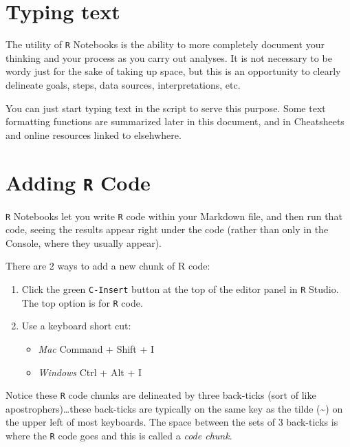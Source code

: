 \documentclass[
]{book}
\newcommand{\passthrough}[1]{#1}
\providecommand{\tightlist}{%
  \setlength{\itemsep}{0pt}\setlength{\parskip}{0pt}}
\begin{document}
\hypertarget{typing-text}{%
\section*{Typing text}\label{typing-text}}

The utility of \passthrough{\lstinline!R!} Notebooks is the ability to more completely document your thinking and your process as you carry out analyses. It is not necessary to be wordy just for the sake of taking up space, but this is an opportunity to clearly delineate goals, steps, data sources, interpretations, etc.

You can just start typing text in the script to serve this purpose. Some text formatting functions are summarized later in this document, and in Cheatsheets and online resources linked to elsehwhere.

\hypertarget{adding-r-code}{%
\section*{\texorpdfstring{Adding \texttt{R} Code}{Adding R Code}}\label{adding-r-code}}

\passthrough{\lstinline!R!} Notebooks let you write \passthrough{\lstinline!R!} code within your Markdown file, and then run that code, seeing the results appear right under the code (rather than only in the Console, where they usually appear).

There are 2 ways to add a new chunk of R code:

\begin{enumerate}
\def\labelenumi{\arabic{enumi}.}
\tightlist
\item
  Click the green \passthrough{\lstinline!C-Insert!} button at the top of the editor panel in \passthrough{\lstinline!R!} Studio. The top option is for \passthrough{\lstinline!R!} code.\\
\item
  Use a keyboard short cut:

  \begin{itemize}
  \tightlist
  \item
    \emph{Mac} Command + Shift + I
  \item
    \emph{Windows} Ctrl + Alt + I
  \end{itemize}
\end{enumerate}

Notice these \passthrough{\lstinline!R!} code chunks are delineated by three back-ticks (sort of like apostrophers)\ldots these back-ticks are typically on the same key as the tilde (\textasciitilde) on the upper left of most keyboards. The space between the sets of 3 back-ticks is where the \passthrough{\lstinline!R!} code goes and this is called a \emph{code chunk}.
\end{document}
